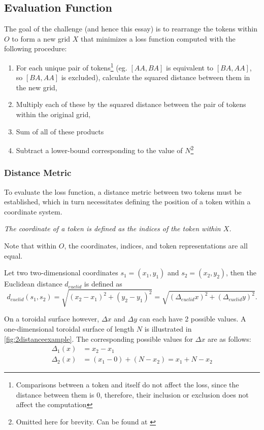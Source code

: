 \subsection{Evaluation Function}%
\label{sub:evaluation_function}

The goal of the challenge (and hence this essay) is to rearrange the tokens within $O$ to form a new grid $X$ that minimizes a loss function computed with the following procedure:
\begin{enumerate}
    \item For each unique pair of tokens\footnote{Comparisons between a token and itself do not affect the loss, since the distance between them is $0$, therefore, their inclusion or exclusion does not affect the computation} (eg. $[AA,BA]$ is equivalent to $[BA,AA]$, so $[BA,AA]$ is excluded), calculate the squared distance between them in the new grid,
    \item Multiply each of these by the squared distance between the pair of tokens within the original grid,
    \item Sum of all of these products
    \item Subtract a lower-bound corresponding to the value of $N$\footnote{Omitted here for brevity. Can be found at \cite{zimmermann}}
\end{enumerate}

\subsubsection{Distance Metric}%
\label{ssub:distance_metric}
To evaluate the loss function, a distance metric between two tokens must be established, which in turn necessitates defining the position of a token within a coordinate system.

\emph{The coordinate of a token is defined as the indices of the token within $X$.}

Note that within $O$, the coordinates, indices, and token representations are all equal.

 Let two two-dimensional coordinates $s_1=(x_1,y_1)$ and $s_2=(x_2,y_2)$, then the Euclidean distance $d_{euclid}$ is defined as
\begin{equation}
    \label{eq:euclid}
    d_{euclid}(s_1,s_2)=\sqrt{(x_2-x_1)^2+(y_2-y_1)^2}=\sqrt{(\Delta_{euclid} x)^2+(\Delta_{euclid} y)^2}.
\end{equation}

On a toroidal surface however, $\Delta x$ and $\Delta y$ can each have 2 possible values. A one-dimensional toroidal surface of length $N$ is illustrated in \autoref{fig:2distanceexample}. The corresponding possible values for $\Delta x$ are as follows:
\begin{align*}
    \Delta_1(x)&=x_2-x_1 \\
    \Delta_2(x)&=(x_1-0)+(N-x_2)=x_1+N-x_2
\end{align*}

